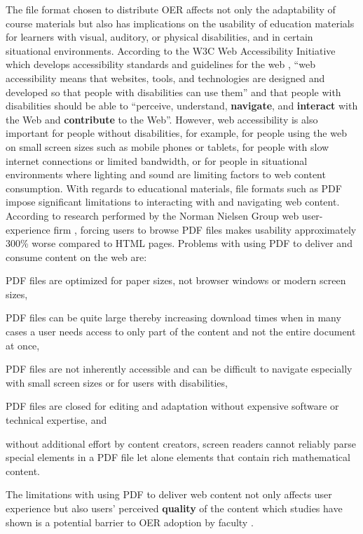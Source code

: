 \documentclass[11pt]{article}
\begin{document}
The file format chosen to distribute OER affects not only the adaptability of course materials but also has implications on the usability of education materials for learners with visual, auditory, or physical disabilities, and in certain situational environments.  According to the W3C Web Accessibility Initiative which develops accessibility standards and guidelines for the web \cite{w3cwai}, ``web accessibility means that websites, tools, and technologies are designed and developed so that people with disabilities can use them'' and that people with disabilities should be able to ``perceive, understand, \textbf{navigate}, and \textbf{interact} with the Web and \textbf{contribute} to the Web''.  However, web accessibility is also important for people without disabilities, for example, for people using the web on small screen sizes such as mobile phones or tablets, for people with slow internet connections or limited bandwidth, or for people in situational environments where lighting and sound are limiting factors to web content consumption.  With regards to educational materials, file formats such as PDF impose significant limitations to interacting with and navigating web content.  According to research performed by the Norman Nielsen Group  web user-experience firm \cite{JN-AK:20}, forcing users to browse PDF files makes usability approximately 300\% worse compared to HTML pages.  Problems with using PDF to deliver and consume content on the web are:
\begin{compactitem}
\item PDF files are optimized for paper sizes, not browser windows or modern screen sizes, 
\item PDF files can be quite large thereby increasing download times when in many cases a user  needs access to only part of the content and not the entire document at once,
\item PDF files are not inherently accessible and can be difficult to navigate especially with small screen sizes or for users with disabilities,
\item PDF files are closed for editing and adaptation without expensive software or technical expertise, and
\item without additional effort by content creators, screen readers cannot reliably parse special elements in a PDF file let alone elements that contain rich mathematical content.
\end{compactitem}
The limitations with using PDF to deliver web content not only affects user experience but also users' perceived \textbf{quality} of the content which studies have shown is a potential barrier to OER adoption by faculty \cite{OB-RB:16, RJ-RP-CH:2016, JS-JS:2018}.
\end{document}
